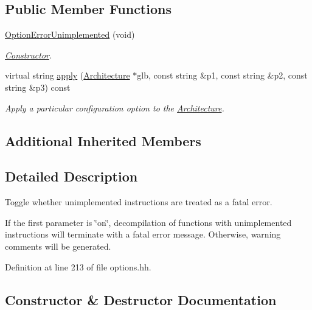 \subsection*{Public Member Functions}
\begin{DoxyCompactItemize}
\item 
\mbox{\hyperlink{class_option_error_unimplemented_a9cc19f9b1e3152ab79a9b21c30fd1898}{Option\+Error\+Unimplemented}} (void)
\begin{DoxyCompactList}\small\item\em \mbox{\hyperlink{class_constructor}{Constructor}}. \end{DoxyCompactList}\item 
virtual string \mbox{\hyperlink{class_option_error_unimplemented_a02c390db41fb158de4a6388210bd6075}{apply}} (\mbox{\hyperlink{class_architecture}{Architecture}} $\ast$glb, const string \&p1, const string \&p2, const string \&p3) const
\begin{DoxyCompactList}\small\item\em Apply a particular configuration option to the \mbox{\hyperlink{class_architecture}{Architecture}}. \end{DoxyCompactList}\end{DoxyCompactItemize}
\subsection*{Additional Inherited Members}


\subsection{Detailed Description}
Toggle whether unimplemented instructions are treated as a fatal error. 

If the first parameter is \char`\"{}on\char`\"{}, decompilation of functions with unimplemented instructions will terminate with a fatal error message. Otherwise, warning comments will be generated. 

Definition at line 213 of file options.\+hh.



\subsection{Constructor \& Destructor Documentation}
\mbox{\label{class_option_error_unimplemented_a9cc19f9b1e3152ab79a9b21c30fd1898}} 
